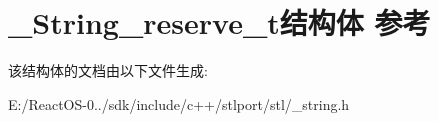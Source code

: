 \hypertarget{struct___string__reserve__t}{}\section{\+\_\+\+String\+\_\+reserve\+\_\+t结构体 参考}
\label{struct___string__reserve__t}


该结构体的文档由以下文件生成\+:\begin{DoxyCompactItemize}
\item 
E\+:/\+React\+O\+S-\/0../sdk/include/c++/stlport/stl/\+\_\+string.\+h\end{DoxyCompactItemize}
